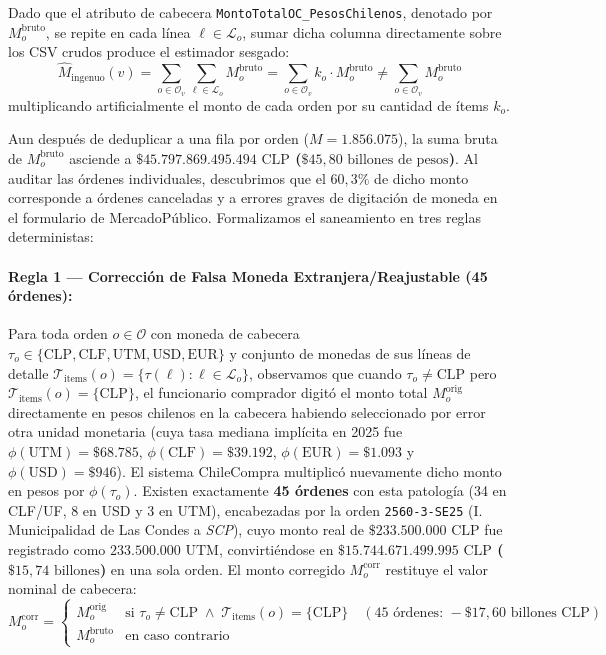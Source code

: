 \documentclass[11pt,a4paper]{article}
\begin{document}
Dado que el atributo de cabecera \texttt{MontoTotalOC\_PesosChilenos}, denotado por $M^{\text{bruto}}_o$, se repite en cada línea $\ell \in \mathcal{L}_o$, sumar dicha columna directamente sobre los CSV crudos produce el estimador sesgado:
\begin{equation}
\widehat{M}_{\text{ingenuo}}(v) = \sum_{o \in \mathcal{O}_v} \sum_{\ell \in \mathcal{L}_o} M^{\text{bruto}}_o = \sum_{o \in \mathcal{O}_v} k_o \cdot M^{\text{bruto}}_o \neq \sum_{o \in \mathcal{O}_v} M^{\text{bruto}}_o
\label{eq:sesgo_items}
\end{equation}
multiplicando artificialmente el monto de cada orden por su cantidad de ítems $k_o$.

Aun después de deduplicar a una fila por orden ($M = 1.856.075$), la suma bruta de $M^{\text{bruto}}_o$ asciende a \textbf{$\$45.797.869.495.494\text{ CLP}$ ($\$45,80\text{ billones de pesos}$)}. Al auditar las órdenes individuales, descubrimos que el $60,3\%$ de dicho monto corresponde a órdenes canceladas y a errores graves de digitación de moneda en el formulario de MercadoPúblico. Formalizamos el saneamiento en tres reglas deterministas:

\paragraph{Regla 1 --- Corrección de Falsa Moneda Extranjera/Reajustable (45 órdenes):}
Para toda orden $o \in \mathcal{O}$ con moneda de cabecera $\tau_o \in \{\text{CLP}, \text{CLF}, \text{UTM}, \text{USD}, \text{EUR}\}$ y conjunto de monedas de sus líneas de detalle $\mathcal{T}_{\text{items}}(o) = \{\tau(\ell) : \ell \in \mathcal{L}_o\}$, observamos que cuando $\tau_o \neq \text{CLP}$ pero $\mathcal{T}_{\text{items}}(o) = \{\text{CLP}\}$, el funcionario comprador digitó el monto total $M^{\text{orig}}_o$ directamente en pesos chilenos en la cabecera habiendo seleccionado por error otra unidad monetaria (cuya tasa mediana implícita en 2025 fue $\phi(\text{UTM}) = \$68.785$, $\phi(\text{CLF}) = \$39.192$, $\phi(\text{EUR}) = \$1.093$ y $\phi(\text{USD}) = \$946$). El sistema ChileCompra multiplicó nuevamente dicho monto en pesos por $\phi(\tau_o)$. Existen exactamente \textbf{45 órdenes} con esta patología (34 en CLF/UF, 8 en USD y 3 en UTM), encabezadas por la orden \texttt{2560-3-SE25} (I. Municipalidad de Las Condes a \textit{SCP}), cuyo monto real de $\$233.500.000\text{ CLP}$ fue registrado como $233.500.000\text{ UTM}$, convirtiéndose en \textbf{$\$15.744.671.499.995\text{ CLP}$ ($\$15,74\text{ billones}$)} en una sola orden. El monto corregido $M^{\text{corr}}_o$ restituye el valor nominal de cabecera:
\begin{equation}
M^{\text{corr}}_o = 
\begin{cases} 
M^{\text{orig}}_o & \text{si } \tau_o \neq \text{CLP} \;\land\; \mathcal{T}_{\text{items}}(o) = \{\text{CLP}\} \quad (\text{45 órdenes: } -\$17,60\text{ billones CLP}) \\[6pt]
M^{\text{bruto}}_o & \text{en caso contrario}
\end{cases}
\label{eq:regla1_moneda}
\end{equation}
\end{document}
